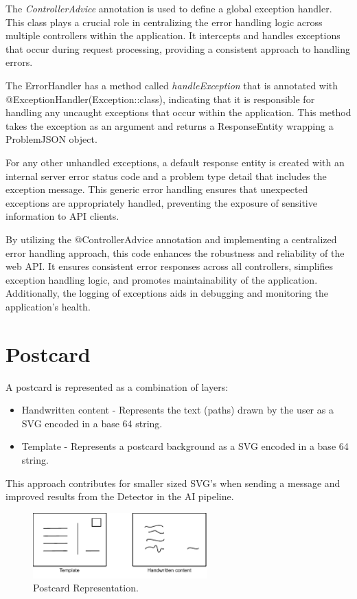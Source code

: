The \textit{ControllerAdvice} annotation is used to define a global exception handler. This class plays a crucial role in centralizing the error handling logic across multiple controllers within the application. It intercepts and handles exceptions that occur during request processing, providing a consistent approach to handling errors.


The ErrorHandler has a method called \textit{handleException} that is annotated with @ExceptionHandler(Exception::class), indicating that it is responsible for handling any uncaught exceptions that occur within the application. This method takes the exception as an argument and returns a ResponseEntity wrapping a ProblemJSON object.

For any other unhandled exceptions, a default response entity is created with an internal server error status code and a problem type detail that includes the exception message. This generic error handling ensures that unexpected exceptions are appropriately handled, preventing the exposure of sensitive information to API clients.

By utilizing the @ControllerAdvice annotation and implementing a centralized error handling approach, this code enhances the robustness and reliability of the web API. It ensures consistent error responses across all controllers, simplifies exception handling logic, and promotes maintainability of the application. Additionally, the logging of exceptions aids in debugging and monitoring the application's health.

\section{Postcard}
A postcard is represented as a combination of layers:
\begin{itemize}
    \item Handwritten content - Represents the text (paths) drawn by the user as a SVG encoded in a base 64 string.
    \item Template - Represents a postcard background as a SVG encoded in a base 64 string. 
\end{itemize}

This approach contributes for smaller sized SVG's when sending a message and improved results from the Detector in the AI pipeline.  

\bigskip
\bigskip
\begin{figure}[!ht]
	\centering
	\includegraphics[width=0.6\textwidth]{./Chapter4/Figures/Postcard Representation}
	\caption{Postcard Representation.}
	\label{fig:Postcard Representation}
\end{figure}



